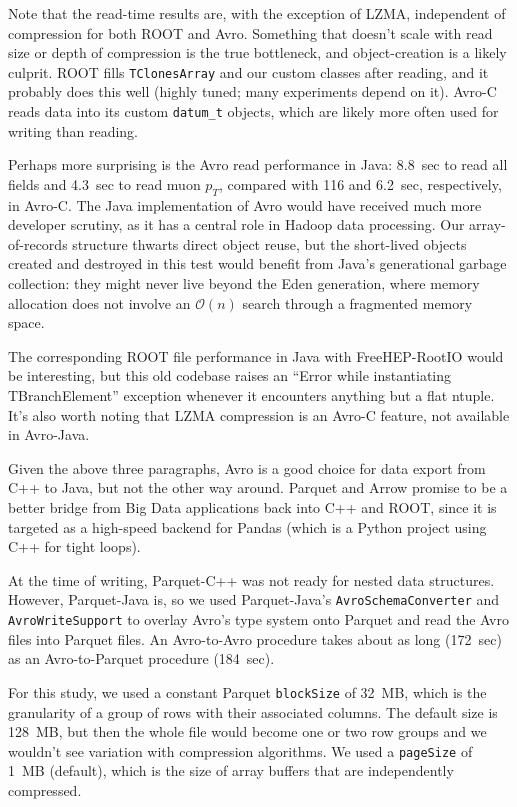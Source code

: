 \documentclass{article}
\begin{document}
Note that the read-time results are, with the exception of LZMA, independent of compression for both ROOT and Avro. Something that doesn't scale with read size or depth of compression is the true bottleneck, and object-creation is a likely culprit. ROOT fills {\tt TClonesArray} and our custom classes after reading, and it probably does this well (highly tuned; many experiments depend on it). Avro-C reads data into its custom {\tt datum\_t} objects, which are likely more often used for writing than reading.

Perhaps more surprising is the Avro read performance in Java: 8.8~sec to read all fields and 4.3~sec to read muon $p_T$, compared with 116 and 6.2~sec, respectively, in Avro-C. The Java implementation of Avro would have received much more developer scrutiny, as it has a central role in Hadoop data processing. Our array-of-records structure thwarts direct object reuse, but the short-lived objects created and destroyed in this test would benefit from Java's generational garbage collection: they might never live beyond the Eden generation, where memory allocation does not involve an $\mathcal{O}(n)$ search through a fragmented memory space.

The corresponding ROOT file performance in Java with FreeHEP-RootIO would be interesting, but this old codebase raises an ``Error while instantiating TBranchElement'' exception whenever it encounters anything but a flat ntuple. It's also worth noting that LZMA compression is an Avro-C feature, not available in Avro-Java.

Given the above three paragraphs, Avro is a good choice for data export from C++ to Java, but not the other way around. Parquet and Arrow promise to be a better bridge from Big Data applications back into C++ and ROOT, since it is targeted as a high-speed backend for Pandas (which is a Python project using C++ for tight loops).

At the time of writing, Parquet-C++ was not ready for nested data structures. However, Parquet-Java is, so we used Parquet-Java's {\tt AvroSchemaConverter} and {\tt AvroWriteSupport} to overlay Avro's type system onto Parquet and read the Avro files into Parquet files. An Avro-to-Avro procedure takes about as long (172~sec) as an Avro-to-Parquet procedure (184~sec). 

For this study, we used a constant Parquet {\tt blockSize} of 32~MB, which is the granularity of a group of rows with their associated columns. The default size is 128~MB, but then the whole file would become one or two row groups and we wouldn't see variation with compression algorithms. We used a {\tt pageSize} of 1~MB (default), which is the size of array buffers that are independently compressed.
\end{document}
